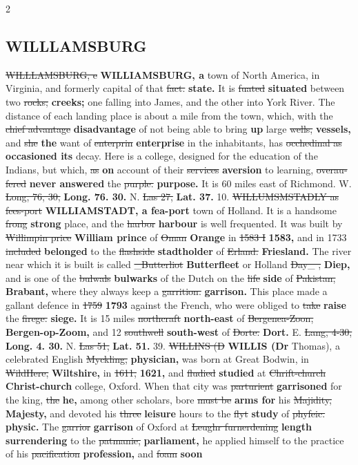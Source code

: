 \documentclass[10pt]{article}
\begin{document}
\begin{multicols}{2}
\subsection*{WILLLAMSBURG}
\sout{WILLLAMSBURG, e} \textbf{WILLIAMSBURG, a} town of North America, in Virginia, and formerly capital of that \sout{fact.} \textbf{state.} It is \sout{fuated} \textbf{situated} between two \sout{rocks;} \textbf{creeks;} one falling into James, and the other into York River. The distance of each landing place is about a mile from the town, which, with the \sout{chief advantage} \textbf{disadvantage} of not being able to bring \textbf{up} large \sout{wells,} \textbf{vessels,} and \sout{she} \textbf{the} want of \sout{enterprin} \textbf{enterprise} in the inhabitants, has \sout{occhedinal as} \textbf{occasioned its} decay. Here is a college, designed for the education of the Indians, but which, \sout{as} \textbf{on} account of their \sout{services} \textbf{aversion} to learning, \sout{overau-fered} \textbf{never answered} the \sout{purple.} \textbf{purpose.} It is 60 miles east of Richmond. W. \sout{Long, 76, 30,} \textbf{Long. 76. 30.} N. \sout{Las 27,} \textbf{Lat. 37.} 10. \sout{WILLUMSMSTADLY as fees-port} \textbf{WILLIAMSTADT, a fea-port} town of Holland. It is a handsome \sout{frong} \textbf{strong} place, and the \sout{harbor} \textbf{harbour} is well frequented. It was built by \sout{Willimpin price} \textbf{William prince} of \sout{Oman} \textbf{Orange} in \sout{1583 I} \textbf{1583,} and in 1733 \sout{included} \textbf{belonged} to the \sout{flashside} \textbf{stadtholder} of \sout{Erland.} \textbf{Friesland.} The river near which it is built is called \sout{\_Butterliot} \textbf{Butterfleet} or Holland \sout{Day\_ ,} \textbf{Diep,} and is one of the \sout{bulwals} \textbf{bulwarks} of the Dutch on the \sout{life} \textbf{side} of \sout{Pakistan,} \textbf{Brabant,} where they always keep a \sout{garrition.} \textbf{garrison.} This place made a gallant defence in \sout{1759} \textbf{1793} against the French, who were obliged to \sout{take} \textbf{raise} the \sout{firege.} \textbf{siege.} It is 15 miles \sout{northcraft} \textbf{north-east} of \sout{Bergenea-Zoon,} \textbf{Bergen-op-Zoom,} and 12 \sout{southwell} \textbf{south-west} of \sout{Dorte.} \textbf{Dort.} E. \sout{Lang, 4-30,} \textbf{Long. 4. 30.} N. \sout{Las 51,} \textbf{Lat. 51.} 39. \sout{WILLINS (D} \textbf{WILLIS (Dr} Thomas), a celebrated English \sout{Myckling,} \textbf{physician,} was born at Great Bodwin, in \sout{WildHere,} \textbf{Wiltshire,} in \sout{1611,} \textbf{1621,} and \sout{fludied} \textbf{studied} at \sout{Chrift-church} \textbf{Christ-church} college, Oxford. When that city was \sout{parturient} \textbf{garrisoned} for the king, \sout{the} \textbf{he,} among other scholars, bore \sout{must be} \textbf{arms for} his \sout{Majidity,} \textbf{Majesty,} and devoted his \sout{three} \textbf{leisure} hours to the \sout{flyt} \textbf{study} of \sout{phyfeic.} \textbf{physic.} The \sout{garrior} \textbf{garrison} of Oxford at \sout{Leughr furnerdening} \textbf{length surrendering} to the \sout{patmanie,} \textbf{parliament,} he applied himself to the practice of his \sout{pacification} \textbf{profession,} and \sout{foam} \textbf{soon} 
\end{multicols}
\end{document}
